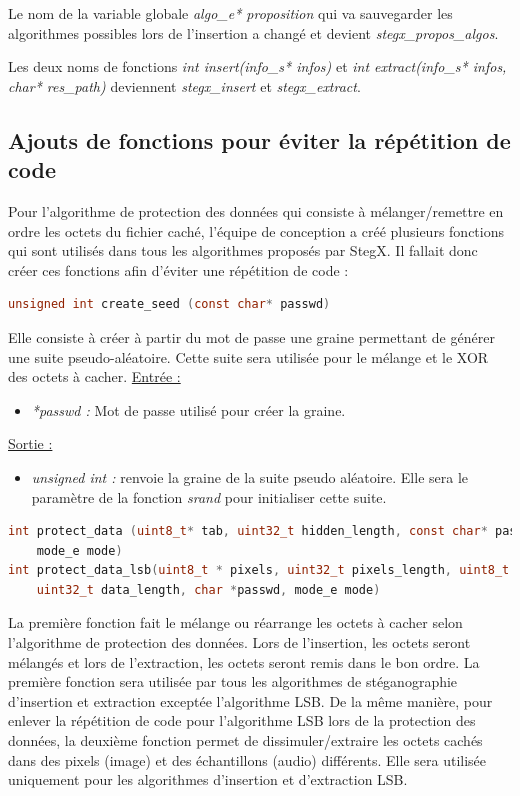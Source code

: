 \documentclass[11pt]{article}
\begin{document}
Le nom de la variable globale \textit{algo\_e* proposition} qui va sauvegarder 
les algorithmes possibles lors de l'insertion a changé et devient 
\textit{stegx\_propos\_algos}. 

Les deux noms de fonctions \textit{int insert(info\_s* infos)} et 
\textit{int extract(info\_s* infos, char* res\_path)} deviennent 
\textit{stegx\_insert} et \textit{stegx\_extract}. 

\subsection{Ajouts de fonctions pour éviter la répétition de code}

Pour l'algorithme de protection des données qui consiste à mélanger/remettre
en ordre les octets du fichier caché, l'équipe de conception a créé plusieurs 
fonctions qui sont utilisés dans tous les algorithmes proposés par StegX. 
Il fallait donc créer ces fonctions afin d'éviter une répétition de code :
 
\begin{lstlisting}[language=c]
unsigned int create_seed (const char* passwd)
\end{lstlisting}

Elle consiste à créer à partir du mot de passe une graine permettant de 
générer une suite pseudo-aléatoire. Cette suite sera utilisée pour le 
mélange et le XOR des octets à cacher. 
\newline
\underline{Entrée :}
\begin{itemize}
\item \textit{*passwd :} Mot de passe utilisé pour créer la graine. 
\end{itemize}
\underline{Sortie :} 
\begin{itemize}
\item \textit{unsigned int :} renvoie la graine de la suite pseudo aléatoire.
Elle sera le paramètre de la fonction \textit{srand} pour initialiser cette 
suite.   
\newline 
\end{itemize}

\begin{lstlisting}[language=c]
int protect_data (uint8_t* tab, uint32_t hidden_length, const char* passwd, 
	mode_e mode)
int protect_data_lsb(uint8_t * pixels, uint32_t pixels_length, uint8_t * data, 
	uint32_t data_length, char *passwd, mode_e mode)
\end{lstlisting}

La première fonction fait le mélange ou réarrange les octets à cacher selon 
l'algorithme de protection des données. Lors de l'insertion, les octets seront 
mélangés et lors de l'extraction, les octets seront remis dans le bon ordre. 
La première fonction sera utilisée par tous les algorithmes de stéganographie 
d'insertion et extraction exceptée l'algorithme LSB.  
De la même manière, pour enlever la répétition de code pour l'algorithme 
LSB lors de la protection des données, la deuxième fonction permet de 
dissimuler/extraire les octets cachés dans des pixels (image) et des 
échantillons (audio) différents. Elle sera utilisée uniquement pour les 
algorithmes d'insertion et d'extraction LSB. 
\end{document}
